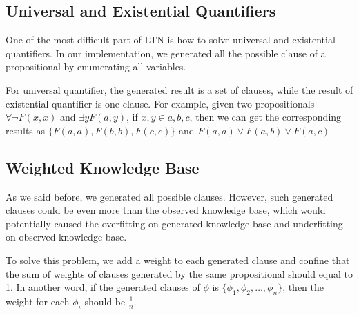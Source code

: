 \subsection{Universal and Existential Quantifiers}

One of the most difficult part of LTN is how to solve universal and existential quantifiers. In our implementation, we generated all the possible clause of a propositional by enumerating all variables.

For universal quantifier, the generated result is a set of clauses, while the result of existential quantifier is one clause. For example, given two propositionals $\forall \neg F(x, x)$ and $\exists y F(a,y)$, if $x,y \in {a,b,c}$, then we can get the corresponding results as $\{F(a,a),F(b,b),F(c,c)\}$ and $F(a,a)\vee F(a,b) \vee F(a,c)$

\subsection{Weighted Knowledge Base}

As we said before, we generated all possible clauses. However, such generated clauses could be even more than the observed knowledge base, which would potentially caused the overfitting on generated knowledge base and underfitting on observed knowledge base.

To solve this problem, we add a weight to each generated clause and confine that the sum of weights of clauses generated by the same propositional should equal to 1. In another word, if the generated clauses of $\phi$ is $\{\phi_1,\phi_2, \dots, \phi_n\}$, then the weight for each $\phi_i$ should be $\frac{1}{n}$.
